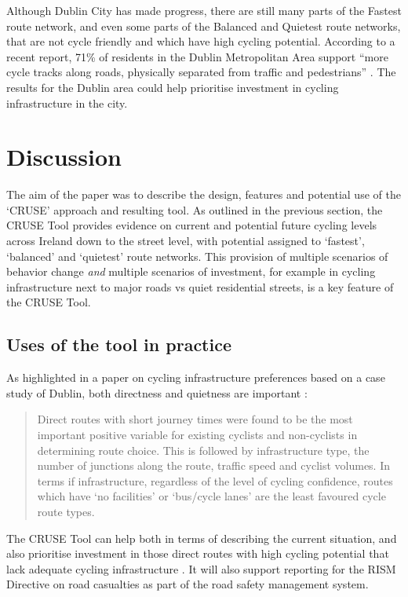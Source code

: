 \documentclass[
  super,
  preprint,
  3p]{elsarticle}
\begin{document}
Although Dublin City has made progress, there are still many parts of
the Fastest route network, and even some parts of the Balanced and
Quietest route networks, that are not cycle friendly and which have high
cycling potential. According to a recent report, 71\% of residents in
the Dublin Metropolitan Area support ``more cycle tracks along roads,
physically separated from traffic and pedestrians'' \citep{walking2021}.
The results for the Dublin area could help prioritise investment in
cycling infrastructure in the city.

\hypertarget{sec-discussion}{%
\section{Discussion}\label{sec-discussion}}

The aim of the paper was to describe the design, features and potential
use of the `CRUSE' approach and resulting tool. As outlined in the
previous section, the CRUSE Tool provides evidence on current and
potential future cycling levels across Ireland down to the street level,
with potential assigned to `fastest', `balanced' and `quietest' route
networks. This provision of multiple scenarios of behavior change
\emph{and} multiple scenarios of investment, for example in cycling
infrastructure next to major roads vs quiet residential streets, is a
key feature of the CRUSE Tool.

\hypertarget{uses-of-the-tool-in-practice}{%
\subsection{Uses of the tool in
practice}\label{uses-of-the-tool-in-practice}}

As highlighted in a paper on cycling infrastructure preferences based on
a case study of Dublin, both directness and quietness are important
\citep{caulfield2012}:

\begin{quote}
Direct routes with short journey times were found to be the most
important positive variable for existing cyclists and non-cyclists in
determining route choice. This is followed by infrastructure type, the
number of junctions along the route, traffic speed and cyclist volumes.
In terms if infrastructure, regardless of the level of cycling
confidence, routes which have `no facilities' or `bus/cycle lanes' are
the least favoured cycle route types.
\end{quote}

The CRUSE Tool can help both in terms of describing the current
situation, and also prioritise investment in those direct routes with
high cycling potential that lack adequate cycling infrastructure
\citep{caulfield2012}. It will also support reporting for the RISM
Directive on road casualties as part of the road safety management
system.
\end{document}
